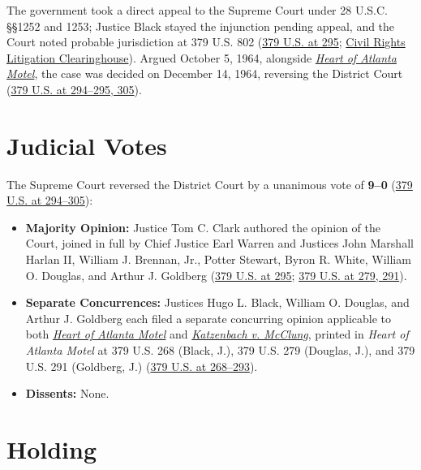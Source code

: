\documentclass[12pt]{article}
\begin{document}
The government took a direct appeal to the Supreme Court under 28 U.S.C. \S\S 1252 and 1253; Justice Black stayed the injunction pending appeal, and the Court noted probable jurisdiction at 379 U.S. 802 (\href{https://supreme.justia.com/cases/federal/us/379/294/}{379 U.S. at 295}; \href{https://clearinghouse.net/case/11136/}{Civil Rights Litigation Clearinghouse}). Argued October 5, 1964, alongside \href{https://supreme.justia.com/cases/federal/us/379/241/}{\textit{Heart of Atlanta Motel}}, the case was decided on December 14, 1964, reversing the District Court (\href{https://supreme.justia.com/cases/federal/us/379/294/}{379 U.S. at 294--295, 305}).

\section{Judicial Votes}

The Supreme Court reversed the District Court by a unanimous vote of \textbf{9--0} (\href{https://supreme.justia.com/cases/federal/us/379/294/}{379 U.S. at 294--305}):

\begin{itemize}
\item \textbf{Majority Opinion:} Justice Tom C. Clark authored the opinion of the Court, joined in full by Chief Justice Earl Warren and Justices John Marshall Harlan II, William J. Brennan, Jr., Potter Stewart, Byron R. White, William O. Douglas, and Arthur J. Goldberg (\href{https://supreme.justia.com/cases/federal/us/379/294/}{379 U.S. at 295}; \href{https://supreme.justia.com/cases/federal/us/379/241/}{379 U.S. at 279, 291}).
\item \textbf{Separate Concurrences:} Justices Hugo L. Black, William O. Douglas, and Arthur J. Goldberg each filed a separate concurring opinion applicable to both \href{https://supreme.justia.com/cases/federal/us/379/241/}{\textit{Heart of Atlanta Motel}} and \href{https://www.courtlistener.com/opinion/106951/katzenbach-v-mcclung/}{\textit{Katzenbach v. McClung}}, printed in \textit{Heart of Atlanta Motel} at 379 U.S. 268 (Black, J.), 379 U.S. 279 (Douglas, J.), and 379 U.S. 291 (Goldberg, J.) (\href{https://supreme.justia.com/cases/federal/us/379/241/}{379 U.S. at 268--293}).
\item \textbf{Dissents:} None.
\end{itemize}

\section{Holding}
\end{document}
